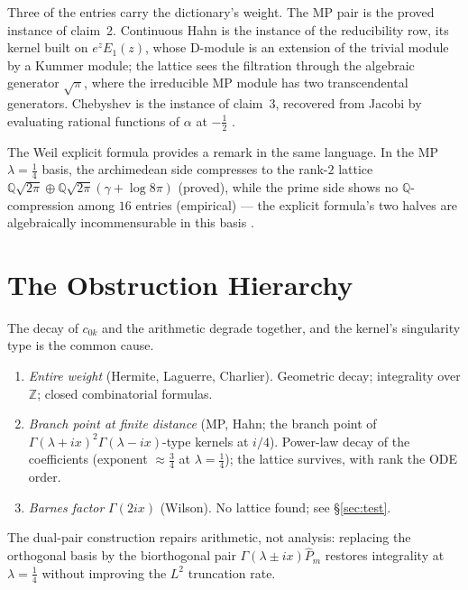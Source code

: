 \documentclass[11pt,a4paper]{article}
\newcommand{\Z}{\mathbb{Z}}
\newcommand{\Q}{\mathbb{Q}}
\begin{document}
Three of the entries carry the dictionary's weight. The MP pair is the
proved instance of claim~2. Continuous Hahn is the instance of the
reducibility row, its kernel built on $e^{z}E_1(z)$, whose D-module is
an extension of the trivial module by a Kummer module; the lattice sees
the filtration through the algebraic generator $\sqrt{\pi}$, where the
irreducible MP module has two transcendental generators. Chebyshev is
the instance of claim~3, recovered from Jacobi by evaluating rational
functions of $\alpha$ at $-\tfrac12$ \cite{jac}.

The Weil explicit formula provides a remark in the same language. In
the MP $\lambda=\tfrac14$ basis, the archimedean side compresses to the
rank-$2$ lattice $\Q\sqrt{2\pi} \oplus \Q\sqrt{2\pi}(\gamma+\log 8\pi)$
(proved), while the prime side shows no $\Q$-compression among $16$
entries (empirical) --- the explicit formula's two halves are
algebraically incommensurable in this basis \cite{weil}.

\section{The Obstruction Hierarchy}

The decay of $c_{0k}$ and the arithmetic degrade together, and the
kernel's singularity type is the common cause.

\begin{enumerate}
\item \emph{Entire weight} (Hermite, Laguerre, Charlier). Geometric
decay; integrality over $\Z$; closed combinatorial formulas.
\item \emph{Branch point at finite distance} (MP, Hahn; the branch
point of $\Gamma(\lambda+ix)^2\Gamma(\lambda-ix)$-type kernels at
$i/4$). Power-law decay of the coefficients (exponent $\approx
\tfrac34$ at $\lambda=\tfrac14$); the lattice survives, with rank the
ODE order.
\item \emph{Barnes factor} $\Gamma(2ix)$ (Wilson). No lattice found;
see \S\ref{sec:test}.
\end{enumerate}

The dual-pair construction repairs arithmetic, not analysis: replacing
the orthogonal basis by the biorthogonal pair
$\Gamma(\lambda\pm ix)\widehat{P}_m$ restores integrality at
$\lambda=\tfrac14$ without improving the $L^2$ truncation rate.
\end{document}
